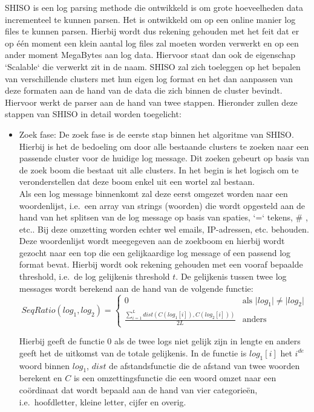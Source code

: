 SHISO is een log parsing methode die ontwikkeld is om grote hoeveelheden data incrementeel te kunnen parsen. Het is ontwikkeld om op een online manier log files te kunnen parsen. Hierbij wordt dus rekening gehouden met het feit dat er op één moment een klein aantal log files zal moeten worden verwerkt en op een ander moment MegaBytes aan log data. Hiervoor staat dan ook de eigenschap `Scalable` die verwerkt zit in de naam. SHISO zal zich toeleggen op het bepalen van verschillende clusters met hun eigen log format en het dan aanpassen van deze formaten aan de hand van de data die zich binnen de cluster bevindt. Hiervoor werkt de parser aan de hand van twee stappen. Hieronder zullen deze stappen van SHISO in detail worden toegelicht: 
\begin{itemize}
    \item Zoek fase: De zoek fase is de eerste stap binnen het algoritme van SHISO. Hierbij is het de bedoeling om door alle bestaande clusters te zoeken naar een passende cluster voor de huidige log message. Dit zoeken gebeurt op basis van de zoek boom die bestaat uit alle clusters. In het begin is het logisch om te veronderstellen dat deze boom enkel uit een wortel zal bestaan.\\
    
    Als een log message binnenkomt zal deze eerst omgezet worden naar een woordenlijst, i.e.\ een array van strings (woorden) die wordt opgesteld aan de hand van het splitsen van de log message op basis van spaties, `=` tekens, \# , etc.. Bij deze omzetting worden echter wel emails, IP-adressen, etc. behouden. Deze woordenlijst wordt meegegeven aan de zoekboom en hierbij wordt gezocht naar een top die een gelijkaardige log message of een passend log format bevat. Hierbij wordt ook rekening gehouden met een vooraf bepaalde threshold, i.e.\ de log gelijkenis threshold $t$. De gelijkenis tussen twee log messages wordt berekend aan de hand van de volgende functie:\\
    \[SeqRatio(log_{1}, log_{2}) = \begin{cases}
        0 & \text{als } \lvert log_{1} \rvert \neq \lvert log_{2} \rvert\\
        \frac{\sum_{i=1}^{L} dist(C(log_{1}[i]), C(log_{2}[i]))}{2L} & \text{anders}
    \end{cases}\]
    
    Hierbij geeft de functie 0 als de twee logs niet gelijk zijn in lengte en anders geeft het de uitkomst van de totale gelijkenis. In de functie is $log_{1}[i]$ het $i^{de}$ woord binnen $log_{1}$, $dist$ de afstandsfunctie die de afstand van twee woorden berekent en $C$ is een omzettingsfunctie die een woord omzet naar een coördinaat dat wordt bepaald aan de hand van vier categorieën, i.e.\ hoofdletter, kleine letter, cijfer en overig.\\
    

\end{itemize}
